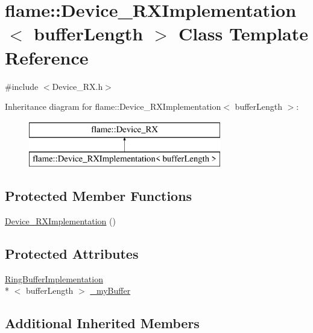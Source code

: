 \hypertarget{classflame_1_1_device___r_x_implementation}{\section{flame\-:\-:Device\-\_\-\-R\-X\-Implementation$<$ buffer\-Length $>$ Class Template Reference}
\label{classflame_1_1_device___r_x_implementation}
}


{\ttfamily \#include $<$Device\-\_\-\-R\-X.\-h$>$}

Inheritance diagram for flame\-:\-:Device\-\_\-\-R\-X\-Implementation$<$ buffer\-Length $>$\-:\begin{figure}[H]
\begin{center}
\leavevmode
\includegraphics[height=2.000000cm]{classflame_1_1_device___r_x_implementation}
\end{center}
\end{figure}
\subsection*{Protected Member Functions}
\begin{DoxyCompactItemize}
\item 
\hyperlink{classflame_1_1_device___r_x_implementation_aa3d7f48ca73db4537ce97795cc462cb5}{Device\-\_\-\-R\-X\-Implementation} ()
\end{DoxyCompactItemize}
\subsection*{Protected Attributes}
\begin{DoxyCompactItemize}
\item 
\hyperlink{classflame_1_1_ring_buffer_implementation}{Ring\-Buffer\-Implementation}\\*
$<$ buffer\-Length $>$ \hyperlink{classflame_1_1_device___r_x_implementation_a33418a9bb5a111865955284a78e38cac}{\-\_\-my\-Buffer}
\end{DoxyCompactItemize}
\subsection*{Additional Inherited Members}


